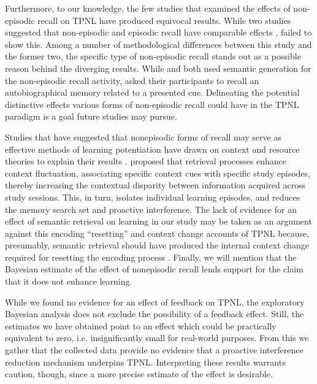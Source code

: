 \documentclass[../main.tex]{subfiles}
\begin{document}
Furthermore, to our knowledge, the few studies that examined the effects of 
non-episodic recall on TPNL have produced equivocal results. While two studies 
suggested that non-episodic and episodic recall have comparable effects
\citep{divisRetrievalSpeedsContext2014, 
pastotterRetrievalLearningFacilitates2011}, \cite{weinsteinNotAllRetrieval2015} 
failed to show this. Among a number of methodological differences between this 
study and the former two, the specific type of non-episodic recall stands out 
as a possible reason behind the diverging results. While 
\cite{pastotterRetrievalLearningFacilitates2011} and 
\cite{divisRetrievalSpeedsContext2014} both used semantic generation for the 
non-episodic recall activity, \cite{weinsteinNotAllRetrieval2015} asked their 
participants to recall an autobiographical memory related to a presented cue. 
Delineating the potential distinctive effects various forms of non-episodic 
recall could have in the TPNL paradigm is a goal future studies may pursue.

Studies that have suggested that nonepisodic forms of recall may serve 
as effective methods of learning potentiation have drawn on context and resource
theories to explain their results \citep{divisRetrievalSpeedsContext2014, 
pastotterRetrievalLearningFacilitates2011}. 
\cite{divisRetrievalSpeedsContext2014} proposed that retrieval processes 
enhance context fluctuation, associating specific context cues with specific 
study episodes, thereby increasing the contextual disparity between information 
acquired across study sessions. This, in turn, isolates individual learning 
episodes, and reduces the memory search set and proactive interference.
The lack of evidence for an effect of semantic retrieval 
on learning in our study may be taken as an argument against this encoding 
``resetting'' and context change accounts of TPNL because, presumably, semantic 
retrieval should have produced the internal context change required for 
resetting the encoding process 
\citep{pastotterRetrievalLearningFacilitates2011}. Finally, we will mention that
the Bayesian estimate of the effect of nonepisodic recall lends support for the
claim that it does not enhance learning.

While we found no evidence for an effect of feedback on TPNL, the exploratory 
Bayesian analysis does not exclude the possibility of a feedback effect. Still, 
the estimates we have obtained point to an effect which could be practically 
equivalent to zero, i.e. insignificantly small for real-world purposes.
From this we gather that the collected data provide no evidence that a 
proactive interference reduction mechanism underpins TPNL. Interpreting these 
results warrants caution, though, since a more precise estimate of the effect 
is desirable.
\end{document}
